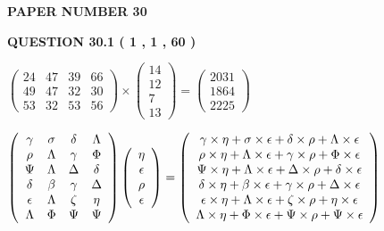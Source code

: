 \documentclass[12pt]{article}
\begin{document}
   
 {\textbf{ \Large{ PAPER NUMBER           30  }}}
   
   
   
   
  
  
{\textbf{\large{QUESTION
30.1 
 (           1 ,           1 ,          60 )
}}}

 
$\left( \begin{array}{ccccccccccccccc}
          24  & 
          47  & 
          39  & 
          66  \\ 
          49  & 
          47  & 
          32  & 
          30  \\ 
          53  & 
          32  & 
          53  & 
          56
\end{array}\right) \times
\left( \begin{array}{c}
          14  \\ 
          12  \\ 
           7  \\ 
          13
\end{array}\right)  =
\left( \begin{array}{c}
        2031  \\ 
        1864  \\ 
        2225
\end{array}\right)  $
 
$  %
 \left( \begin{array}
 {
 c
 c
 c
 c
 }
 \gamma & 
 \sigma & 
 \delta & 
 \Lambda \\ 
 \rho & 
 \Lambda & 
 \gamma & 
 \Phi \\ 
 \Psi & 
 \Lambda & 
 \Delta & 
 \delta \\ 
 \delta & 
 \beta & 
 \gamma & 
 \Delta \\ 
 \epsilon & 
 \Lambda & 
                    \zeta & 
 \eta \\ 
 \Lambda & 
 \Phi & 
 \Psi & 
 \Psi
 \end{array} \right)
 \left( \begin{array}
 {
 c
 }
 \eta \\ 
 \epsilon \\ 
 \rho \\ 
 \epsilon
 \end{array} \right)
=
 \left( \begin{array}
 {
 c
 }
  \gamma \times  \eta +  \sigma \times  \epsilon +  \delta \times  \rho +  \Lambda \times  \epsilon \\ 
  \rho \times  \eta +  \Lambda \times  \epsilon +  \gamma \times  \rho +  \Phi \times  \epsilon \\ 
  \Psi \times  \eta +  \Lambda \times  \epsilon +  \Delta \times  \rho +  \delta \times  \epsilon \\ 
  \delta \times  \eta +  \beta \times  \epsilon +  \gamma \times  \rho +  \Delta \times  \epsilon \\ 
  \epsilon \times  \eta +  \Lambda \times  \epsilon +                     \zeta \times  \rho +  \eta \times  \epsilon \\ 
  \Lambda \times  \eta +  \Phi \times  \epsilon +  \Psi \times  \rho +  \Psi \times  \epsilon
 \end{array} \right)
$
 
\end{document}

